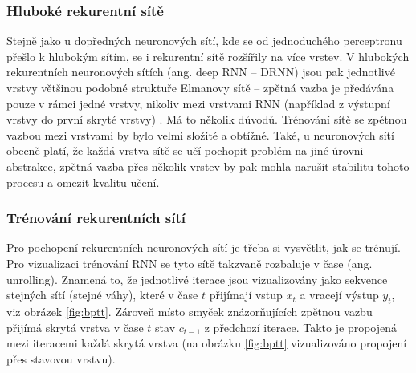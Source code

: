

\subsubsection*{Hluboké rekurentní sítě}

Stejně jako u dopředných neuronových sítí, kde se od jednoduchého perceptronu
přešlo k hlubokým sítím, se i rekurentní sítě rozšířily na více vrstev. V
hlubokých rekurentních neuronových sítích (ang. deep RNN – DRNN) jsou pak
jednotlivé vrstvy většinou podobné struktuře Elmanovy sítě \cite{elman} –
zpětná vazba je předávána pouze v rámci jedné vrstvy, nikoliv mezi vrstvami RNN
(například z výstupní vrstvy do první skryté vrstvy) \cite{deeprnn}. Má to
několik důvodů. Trénování sítě se zpětnou vazbou mezi vrstvami by bylo velmi
složité a obtížné. Také, u neuronových sítí obecně platí, že každá vrstva sítě
se učí pochopit problém na jiné úrovni abstrakce, zpětná vazba přes několik
vrstev by pak mohla narušit stabilitu tohoto procesu a omezit kvalitu učení.

\subsubsection*{Trénování rekurentních sítí}

Pro pochopení rekurentních neuronových sítí je třeba si vysvětlit, jak se
trénují. Pro vizualizaci trénování RNN se tyto sítě takzvaně rozbaluje v čase
(ang. unrolling). Znamená to, že jednotlivé iterace jsou vizualizovány jako
sekvence stejných sítí (stejné váhy), které v čase $t$ přijímají vstup $x_t$ a
vracejí výstup $y_t$, viz obrázek \ref{fig:bptt}. Zároveň místo smyček
znázorňujících zpětnou vazbu přijímá skrytá vrstva v čase $t$ stav $c_{t-1}$ z
předchozí iterace. Takto je propojená mezi iteracemi každá skrytá vrstva (na
obrázku \ref{fig:bptt} vizualizováno propojení přes stavovou vrstvu).

